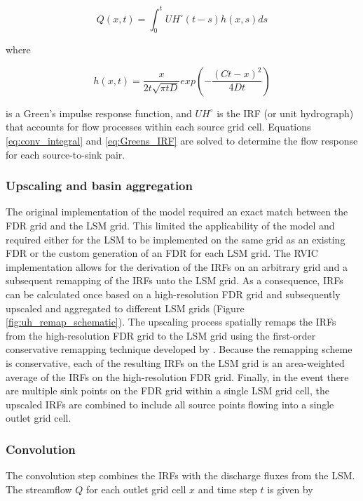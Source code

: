 \documentclass[jgrga, draft]{agutex}
\begin{document}
\begin{article}
 \begin{equation}
   \label{eq:conv_integral}
	  Q(x,t) = \int_0^t UH^{\circ}(t-s)h(x,s)ds
 \end{equation}

where

 \begin{equation}
   \label{eq:Greens_IRF}
	h(x, t) = \frac{x}{2t\sqrt{\pi tD}}exp\left(-\frac{(Ct-x)^2}{4Dt}\right)
 \end{equation}

is a Green's impulse response function, and $UH^{\circ}$ is the IRF (or unit hydrograph) that accounts for flow processes within each source grid cell.
Equations \ref{eq:conv_integral} and \ref{eq:Greens_IRF} are solved to determine the flow response for each source-to-sink pair.

\subsubsection{Upscaling and basin aggregation}
\label{sec:remap}

The original implementation of the \citet{Lohmann_1996} model required an exact match between the FDR grid and the LSM grid.
This limited the applicability of the model and required either for the LSM to be implemented on the same grid as an existing FDR or the custom generation of an FDR for each LSM grid.
The RVIC implementation allows for the derivation of the IRFs on an arbitrary grid and a subsequent remapping of the IRFs unto the LSM grid.
As a consequence, IRFs can be calculated once based on a high-resolution FDR grid and subsequently upscaled and aggregated to different LSM grids (Figure \ref{fig:uh_remap_schematic}).
The upscaling process spatially remaps the IRFs from the high-resolution FDR grid to the LSM grid using the first-order conservative remapping technique developed by \citet{Jones_1999}.
Because the remapping scheme is conservative, each of the resulting IRFs on the LSM grid is an area-weighted average of the IRFs on the high-resolution FDR grid.
Finally, in the event there are multiple sink points on the FDR grid within a single LSM grid cell, the upscaled IRFs are combined to include all source points flowing into a single outlet grid cell.

\subsubsection{Convolution}
\label{sec:convolution}

The convolution step combines the IRFs with the discharge fluxes from the LSM.
The streamflow $Q$ for each outlet grid cell $x$ and time step $t$ is given by


\end{article}
\end{document}
